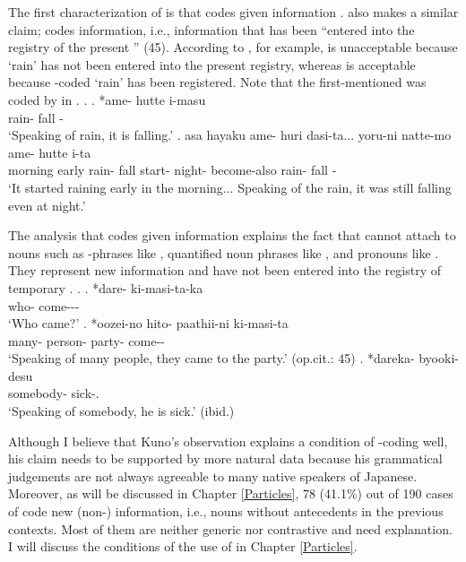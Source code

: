 The first characterization of  is that
 codes given information
\cite[233]{chafe70}.
 also makes a similar claim;
 codes  information,
i.e.,
information that has been ``entered into the registry of the
present '' (45).
According to , for example,
\Next[a] is unacceptable because
 `rain' has not been entered into the present registry,
whereas \Next[b] is acceptable because
-coded  `rain' has been registered.
Note that the first-mentioned  was coded by  in \Next[b].
%
\ex.
 \ag. *ame- hutte i-masu \\
       rain- fall - \\
       `Speaking of rain, it is falling.'
 \bg. asa hayaku ame- huri dasi-ta... yoru-ni natte-mo ame- hutte i-ta \\
       morning early rain- fall start- night- become-also rain- fall -\\
       `It started raining early in the morning...
       Speaking of the rain, it was still falling even at night.'
       \hfill{\cite[45]{kuno73}}


The analysis that  codes given information
explains the fact that
 cannot attach to nouns such as -phrases like \Next[a],
quantified noun phrases like \Next[b],
and  pronouns like \Next[c].
They represent new information and have not been entered into the registry of temporary .
%
\ex.
 \ag. *dare- ki-masi-ta-ka \\
       who- come--- \\
       `Who came?'
       \hfill{\cite[37]{kuno73}}
 \bg. *oozei-no hito- paathii-ni ki-masi-ta \\
       many- person- party- come-- \\
       `Speaking of many people, they came to the party.'
       \hfill{(op.cit.: 45)}
 \bg. *dareka- byooki-desu \\
       somebody- sick-.\\
       `Speaking of somebody, he is sick.'
       \hfill{(ibid.)}


Although I believe that Kuno's observation explains
a condition of -coding well,
his claim needs to be supported by more natural data
because his grammatical judgements are not always agreeable to many native speakers of Japanese.
Moreover,
as will be discussed in Chapter \ref{Particles},
78 (41.1\%) out of 190 cases of  code new (non-) information, i.e., nouns without antecedents in the previous contexts. 
Most of them are neither generic nor contrastive and need explanation.
I will discuss the conditions of the use of 
in Chapter \ref{Particles}.


